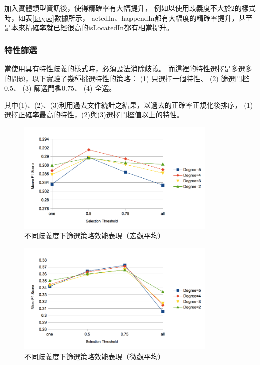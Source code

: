 加入實體類型資訊後，使得精確率有大幅提升，
例如以使用歧義度不大於2的樣式時，如表\ref{t:type}數據所示，
actedIn、happendIn都有大幅度的精確率提升，甚至是本來精確率就已經很高的isLocatedIn都有相當提升。



\subsubsection{特性篩選}
當使用具有特性歧義的樣式時，必須設法消除歧義。
而這裡的特性選擇是多選多的問題，以下實驗了幾種挑選特性的策略：
(1) 只選擇一個特性、 (2) 篩選門檻0.5、 (3) 篩選門檻0.75、 (4) 全選。

其中(1)、(2)、(3)利用過去文件統計之結果，以過去的正確率正規化後排序，
(1)選擇正確率最高的特性，(2)與(3)選擇門檻值以上的特性。

\begin{figure}[h]
    \centering
    \includegraphics[width=0.85\textwidth]{images/04-macro-nol}
    \caption{不同歧義度下篩選策略效能表現（宏觀平均）}
    \label{i:macro-nol}
\end{figure}

\begin{figure}[h]
    \centering
    \includegraphics[width=0.85\textwidth]{images/04-micro-nol}
    \caption{不同歧義度下篩選策略效能表現（微觀平均）}
    \label{i:micro-nol}
\end{figure}

